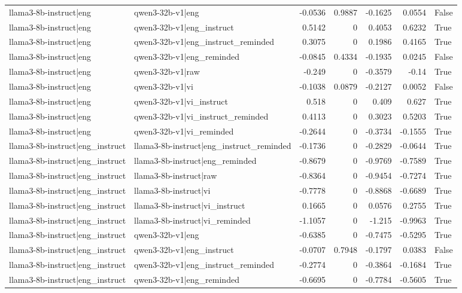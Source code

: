 \begin{table}
\begin{tabular}{l l r r r r l}
llama3-8b-instruct|eng & qwen3-32b-v1|eng & -0.0536 & 0.9887 & -0.1625 & 0.0554 & False \\
llama3-8b-instruct|eng & qwen3-32b-v1|eng_instruct & 0.5142 & 0 & 0.4053 & 0.6232 & True \\
llama3-8b-instruct|eng & qwen3-32b-v1|eng_instruct_reminded & 0.3075 & 0 & 0.1986 & 0.4165 & True \\
llama3-8b-instruct|eng & qwen3-32b-v1|eng_reminded & -0.0845 & 0.4334 & -0.1935 & 0.0245 & False \\
llama3-8b-instruct|eng & qwen3-32b-v1|raw & -0.249 & 0 & -0.3579 & -0.14 & True \\
llama3-8b-instruct|eng & qwen3-32b-v1|vi & -0.1038 & 0.0879 & -0.2127 & 0.0052 & False \\
llama3-8b-instruct|eng & qwen3-32b-v1|vi_instruct & 0.518 & 0 & 0.409 & 0.627 & True \\
llama3-8b-instruct|eng & qwen3-32b-v1|vi_instruct_reminded & 0.4113 & 0 & 0.3023 & 0.5203 & True \\
llama3-8b-instruct|eng & qwen3-32b-v1|vi_reminded & -0.2644 & 0 & -0.3734 & -0.1555 & True \\
llama3-8b-instruct|eng_instruct & llama3-8b-instruct|eng_instruct_reminded & -0.1736 & 0 & -0.2829 & -0.0644 & True \\
llama3-8b-instruct|eng_instruct & llama3-8b-instruct|eng_reminded & -0.8679 & 0 & -0.9769 & -0.7589 & True \\
llama3-8b-instruct|eng_instruct & llama3-8b-instruct|raw & -0.8364 & 0 & -0.9454 & -0.7274 & True \\
llama3-8b-instruct|eng_instruct & llama3-8b-instruct|vi & -0.7778 & 0 & -0.8868 & -0.6689 & True \\
llama3-8b-instruct|eng_instruct & llama3-8b-instruct|vi_instruct & 0.1665 & 0 & 0.0576 & 0.2755 & True \\
llama3-8b-instruct|eng_instruct & llama3-8b-instruct|vi_reminded & -1.1057 & 0 & -1.215 & -0.9963 & True \\
llama3-8b-instruct|eng_instruct & qwen3-32b-v1|eng & -0.6385 & 0 & -0.7475 & -0.5295 & True \\
llama3-8b-instruct|eng_instruct & qwen3-32b-v1|eng_instruct & -0.0707 & 0.7948 & -0.1797 & 0.0383 & False \\
llama3-8b-instruct|eng_instruct & qwen3-32b-v1|eng_instruct_reminded & -0.2774 & 0 & -0.3864 & -0.1684 & True \\
llama3-8b-instruct|eng_instruct & qwen3-32b-v1|eng_reminded & -0.6695 & 0 & -0.7784 & -0.5605 & True \\

\end{tabular}
\end{table}
